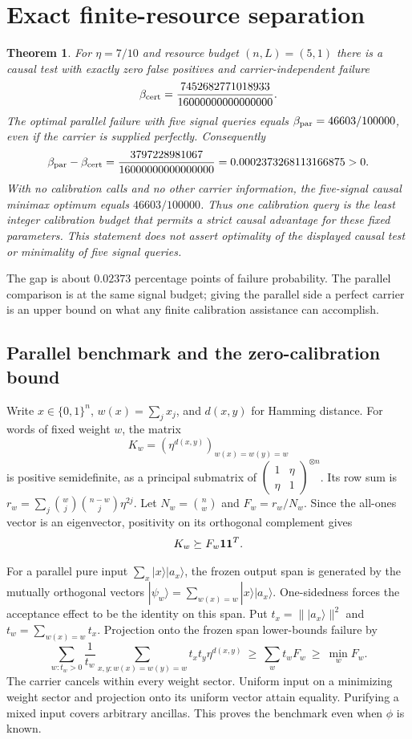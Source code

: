 \documentclass[11pt,a4paper]{article}
\newtheorem{theorem}{Theorem}
\newcommand{\ket}[1]{|#1\rangle}
\begin{document}
\section{Exact finite-resource separation}
\begin{theorem}\label{main}
For $\eta=7/10$ and resource budget $(n,L)=(5,1)$ there is a causal test with exactly zero false positives and carrier-independent failure
\[
 \beta_{\rm cert}=\frac{7452682771018933}{16000000000000000}.
\]
The optimal parallel failure with five signal queries equals $\beta_{\rm par}=46603/100000$, even if the carrier is supplied perfectly. Consequently
\[
 \beta_{\rm par}-\beta_{\rm cert}
 =\frac{3797228981067}{16000000000000000}
 =0.0002373268113166875>0.
\]
With no calibration calls and no other carrier information, the five-signal causal minimax optimum equals $46603/100000$. Thus one calibration query is the least integer calibration budget that permits a strict causal advantage for these fixed parameters. This statement does not assert optimality of the displayed causal test or minimality of five signal queries.
\end{theorem}
The gap is about $0.02373$ percentage points of failure probability. The parallel comparison is at the same signal budget; giving the parallel side a perfect carrier is an upper bound on what any finite calibration assistance can accomplish.

\subsection{Parallel benchmark and the zero-calibration bound}
Write $x\in\{0,1\}^n$, $w(x)=\sum_jx_j$, and $d(x,y)$ for Hamming distance. For words of fixed weight $w$, the matrix
\[
 K_w=(\eta^{d(x,y)})_{w(x)=w(y)=w}
\]
is positive semidefinite, as a principal submatrix of
$\left(\begin{smallmatrix}1&\eta\\\eta&1\end{smallmatrix}\right)^{\otimes n}$.
Its row sum is $r_w=\sum_j\binom{w}{j}\binom{n-w}{j}\eta^{2j}$.
Let $N_w=\binom nw$ and $F_w=r_w/N_w$. Since the all-ones vector is an eigenvector, positivity on its orthogonal complement gives
\begin{equation}\label{matrix-bound}
 K_w\succeq F_w {\bf1}{\bf1}^{T}.
\end{equation}

For a parallel pure input $\sum_x\ket{x}\ket{a_x}$, the frozen output span is generated by the mutually orthogonal vectors
$\ket{\psi_w}=\sum_{w(x)=w}\ket{x}\ket{a_x}$.
One-sidedness forces the acceptance effect to be the identity on this span. Put $t_x=\|\ket{a_x}\|^2$ and $t_w=\sum_{w(x)=w}t_x$.
Projection onto the frozen span lower-bounds failure by
\[
 \sum_{w:t_w>0}\frac{1}{t_w}
       \sum_{x,y:w(x)=w(y)=w}t_xt_y\eta^{d(x,y)}
 \ \geq\ \sum_w t_wF_w\ \geq\ \min_w F_w .
\]
The carrier cancels within every weight sector. Uniform input on a minimizing weight sector and projection onto its uniform vector attain equality. Purifying a mixed input covers arbitrary ancillas. This proves the benchmark even when $\phi$ is known.
\end{document}
